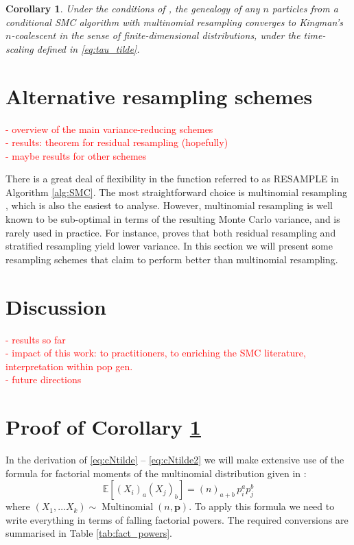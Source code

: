 \documentclass[fleqn]{article}
\newtheorem{corollary}{Corollary}
\newcommand{\E}{\mathbb{E}}
\newcommand{\Mn}{\operatorname{Multinomial}}
\begin{document}
\begin{corollary}\label{thm:condSMC_kingman}
Under the conditions of \citet[Lemma 3]{koskela2018}, the genealogy of any $n$ particles from a conditional SMC algorithm with multinomial resampling converges to Kingman's $n$-coalescent in the sense of finite-dimensional distributions, under the time-scaling defined in \eqref{eq:tau_tilde}.
\end{corollary}


\section{Alternative resampling schemes}\label{sec:resampling}
\textcolor{red}{
- overview of the main variance-reducing schemes\\
- results: theorem for residual resampling (hopefully)\\
- maybe results for other schemes
}

There is a great deal of flexibility in the function referred to as {\footnotesize RESAMPLE} in Algorithm \ref{alg:SMC}. The most straightforward choice is multinomial resampling \citep{efron1994}, which is also the easiest to analyse. However, multinomial resampling is well known to be sub-optimal in terms of the resulting Monte Carlo variance, and is rarely used in practice. For instance, \citet{douc2005} proves that both residual resampling and stratified resampling yield lower variance. 
In this section we will present some resampling schemes that claim to perform better than multinomial resampling.

\section{Discussion}
\textcolor{red}{
- results so far\\
- impact of this work: to practitioners, to enriching the SMC literature, interpretation within pop gen.\\
- future directions
}

\appendix
\section{Proof of Corollary \ref{thm:condSMC_kingman}}
In the derivation of \eqref{eq:cNtilde} -- \eqref{eq:cNtilde2} we will make extensive use of the formula for factorial moments of the multinomial distribution given in \citet[p.67]{mosimann1962}:
\begin{equation} \label{eq:mn_moments}
\E[(X_i)_a(X_j)_b] = (n)_{a+b}\, p_i^a p_j^b
\end{equation}
where $(X_1,\dots X_k) \sim \Mn(n, \mathbf{p})$.
To apply this formula we need to write everything in terms of falling factorial powers. The required conversions are summarised in Table \ref{tab:fact_powers}.
\end{document}
